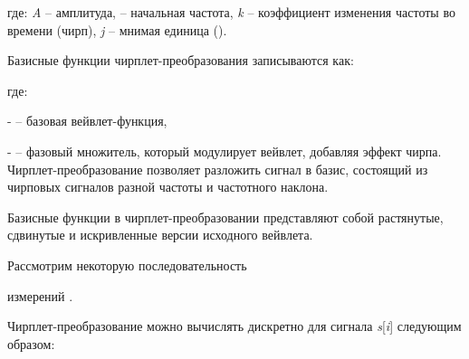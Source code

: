 где: \emph{A} -- амплитуда,
--
начальная частота, \emph{k} -- коэффициент изменения частоты во времени
(чирп), \emph{j} -- мнимая единица
().

Базисные функции чирплет-преобразования записываются как:


где:

- 
-- базовая вейвлет-функция,

- 
-- фазовый множитель, который модулирует вейвлет, добавляя эффект
чирпа.
Чирплет-преобразование позволяет разложить сигнал в базис, состоящий из
чирповых сигналов разной частоты и частотного наклона.

Базисные функции в чирплет-преобразовании представляют собой растянутые,
сдвинутые и искривленные версии исходного вейвлета.

Рассмотрим некоторую последовательность

измерений
.

Чирплет-преобразование можно вычислять дискретно для сигнала
\emph{s}{[}\emph{i}{]} следующим образом:


